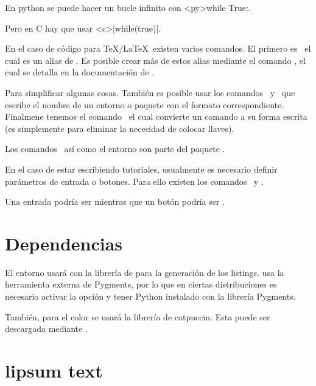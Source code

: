 \documentclass[theme=mocha, pagecolor, pagesize=a5paper, stretchmode=true]{qx-files/qx-notes}
\begin{document}
  \begin{texexample}
    En python se puede hacer un bucle infinito con 
    \codeline<py>{while True:}.

    Pero en C hay que usar \codeline<c>|while(true){}|.
  \end{texexample}


  En el caso de código para \TeX/\LaTeX\ existen varios comandos. El primero es \texcs\texline\ el cual es un alias de . Es posible crear más de estos alias mediante el comando \texcs\newmintinline, el cual se detalla en la documentación de .

  Para simplificar algunas cosas. También es posible usar los comandos \texcs\texenvname\ y \texcs\texpkgname\ que escribe el nombre de un entorno o paquete con el formato correspondiente. Finalmene tenemos el comando \texcs\texcs\ el cual convierte un comando a su forma escrita (es simplemente para eliminar la necesidad de colocar llaves).

  \begin{texexample}
    Los comandos \texcs\mint\ así como el entorno
     son parte del paquete .
  \end{texexample}

  En el caso de estar escribiendo tutoriales, usualmente es necesario definir parámetros de entrada o botones. Para ello existen los comandos \texcs{}\ y \texcs\keybutton. 

  \begin{texexample}
    Una entrada podría ser  mientras que un botón podría ser .
  \end{texexample}

  \section{Dependencias}

  El entorno  usará  con la librería de  para la generación de los listings.  usa la herramienta externa de Pygments, por lo que en ciertas distribuciones es necesario activar la opción  y tener Python instalado con la librería Pygments.

  También, para el color se usará la librería de catpuccin. Esta puede ser descargada mediante .




  \section{lipsum text}

  \lipsum
\end{document}
